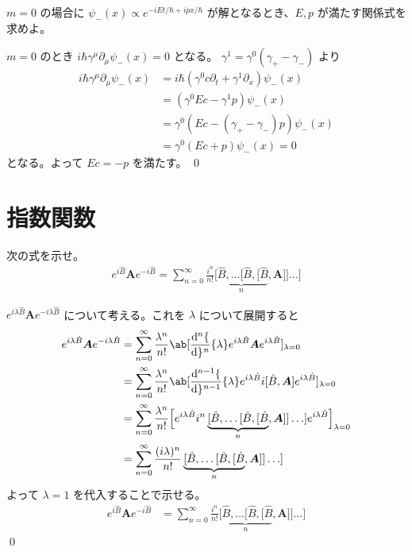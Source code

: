 \documentclass[uplatex,dvipdfmx,a4paper,11pt]{jlreq}
\makeatletter
\theoremstyle{definition}
\renewenvironment{proof}[1][\proofname]{\par
  \normalfont
  \topsep6\p@\@plus6\p@ \trivlist
  \item[\hskip\labelsep{\bfseries #1}\@addpunct{\bfseries}]\ignorespaces\quad\par
}{%
  \qed\endtrivlist\@endpefalse
}
\renewcommand\proofname{証明}
\newcommand{\BB}{\bm{B}}
\renewcommand{\AA}{\hat{A}}
\renewcommand{\BB}{\hat{B}}
\renewcommand{\AA}{\bm{A}}
\numberwithin{equation}{section}
\makeatother
\begin{document}
\begin{problem}
$m = 0$ の場合に $\psi_-(x) \propto e^{-iEt/\hbar+ipx/\hbar}$ が解となるとき、$E, p$ が満たす関係式を求めよ。
\end{problem}
\begin{proof}
  $m = 0$ のとき $i\hbar\gamma^\mu\partial_\mu\psi_-(x) = 0$ となる。 $\gamma^1 = \gamma^0(\gamma_+ - \gamma_-)$ より
  \begin{align}
    i\hbar\gamma^\mu\partial_\mu\psi_-(x) & = i\hbar(\gamma^0c\partial_t + \gamma^1\partial_x)\psi_-(x) \\
                                          & = (\gamma^0Ec - \gamma^1p)\psi_-(x)                         \\
                                          & = \gamma^0(Ec - (\gamma_+ - \gamma_-)p)\psi_-(x)            \\
                                          & = \gamma^0(Ec + p)\psi_-(x) = 0
  \end{align}
  となる。よって $Ec = -p$ を満たす。
\end{proof}

\section{指数関数}

\begin{problem}
次の式を示せ。
\begin{align}
  e^{i\BB}\AA e^{-i\BB} = \sum_{n=0}^{\infty}\frac{i^n}{n!}\underbrace{[\BB, \ldots [\BB, [\BB}_{n}, \AA]] \ldots]
\end{align}
\end{problem}
\begin{proof}
  $e^{i\lambda\BB}\AA e^{-i\lambda\BB}$ について考える。これを $\lambda$ について展開すると
  \begin{align}
    e^{i\lambda\BB}\AA e^{-i\lambda\BB} & = \sum_{n=0}^{\infty}\frac{\lambda^n}{n!}\ab[\diff[n]{}{\lambda}e^{i\lambda\BB}\AA e^{i\lambda\BB}]_{\lambda = 0}                                         \\
                                        & = \sum_{n=0}^{\infty}\frac{\lambda^n}{n!}\ab[\diff[n-1]{}{\lambda}e^{i\lambda\BB}i[\BB, \AA]e^{i\lambda\BB}]_{\lambda = 0}                                \\
                                        & = \sum_{n=0}^{\infty}\frac{\lambda^n}{n!}\Big[e^{i\lambda\BB}i^n\underbrace{[\BB, \ldots [\BB, [\BB}_{n}, \AA]] \ldots]e^{i\lambda\BB}\Big]_{\lambda = 0} \\
                                        & = \sum_{n=0}^{\infty}\frac{(i\lambda)^n}{n!}\underbrace{[\BB, \ldots [\BB, [\BB}_{n}, \AA]] \ldots]
  \end{align}
  よって $\lambda = 1$ を代入することで示せる。
  \begin{align}
    e^{i\BB}\AA e^{-i\BB} & = \sum_{n=0}^{\infty}\frac{i^n}{n!}\underbrace{[\BB, \ldots [\BB, [\BB}_{n}, \AA]] \ldots]
  \end{align}
\end{proof}
\end{document}
